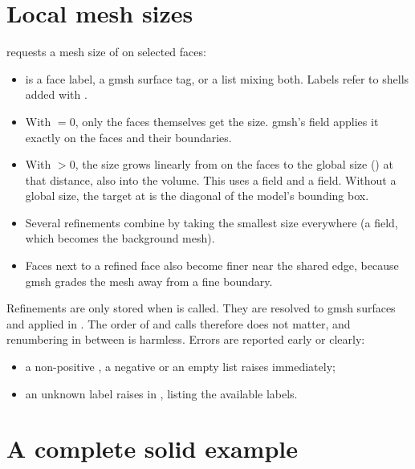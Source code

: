 \section{Local mesh sizes}\label{sec:mesh-sizes}

 requests a mesh size of  on selected faces:

\begin{itemize}
  \item {} is a face label, a gmsh surface tag, or a list mixing both. Labels refer
    to shells added with .
  \item With  $=0$, only the faces themselves get the size. gmsh's
     field applies it exactly on the faces and their boundaries.
  \item With  $>0$, the size grows linearly from  on the faces to the
    global size () at that distance, also into the volume. This uses a
     field and a  field. Without a global size, the target at
     is the diagonal of the model's bounding box.
  \item Several refinements combine by taking the smallest size everywhere (a 
    field, which becomes the background mesh).
  \item Faces next to a refined face also become finer near the shared edge, because gmsh
    grades the mesh away from a fine boundary.
\end{itemize}

Refinements are only stored when  is called. They are resolved to gmsh surfaces
and applied in . The order of  and  calls therefore
does not matter, and renumbering in between is harmless. Errors are reported early or clearly:
\begin{itemize}
  \item a non-positive , a negative  or an empty list raises
     immediately;
  \item an unknown label raises  in , listing the available labels.
\end{itemize}

\section{A complete solid example}

